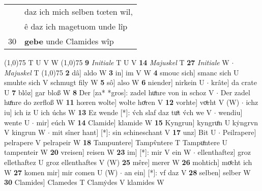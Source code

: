 \documentclass[8pt,a4paper,notitlepage]{article}
\begin{document}
\begin{table}[ht]
\begin{minipage}[t]{0.5\linewidth}
\begin{tabular}{rl}
 & daz ich mich selben tœten wil,\\ 
 & ê daz ich magetuom unde lîp\\ 
30 & \textbf{gebe} unde Clamides wîp\\ 
\end{tabular}
\scriptsize
\line(1,0){75} \newline
T U V W \newline
\line(1,0){75} \newline
\textbf{9} \textit{Initiale} T U V  \textbf{14} \textit{Majuskel} T  \textbf{27} \textit{Initiale} W   $\cdot$ \textit{Majuskel} T  \newline
\line(1,0){75} \newline
\textbf{2} dâ] aldo W \textbf{3} in] im V W \textbf{4} smouc sich] smanc sich U smuhte sich V schmugt fily W \textbf{5} sô] also W \textbf{6} niender] nirkein U  $\cdot$ krâte] da crate U \textbf{7} blôz] gar bloß W \textbf{8} Der [za* *gros]: zadel huͤnre von in schoz V  $\cdot$ Der zadel huͤnre do zerfloß W \textbf{11} hœren wolte] wolte hoͤren V \textbf{12} vorhte] voͤrht V (W)  $\cdot$ ichz iu] ich iz U ich úchs W \textbf{13} Ez wende [*]: v́ch slaf daz tuͦt v́ch we V  $\cdot$ wendiu] wente U  $\cdot$ mir] eúch W \textbf{14} Clamide] klamide W \textbf{15} Kyngrun] kyngruͦn U kẏngrvn V kingrun W  $\cdot$ mit sîner hant] [*]: sin schineschant V \textbf{17} unz] Bit U  $\cdot$ Peilrapere] pelrapere V pelrapeir W \textbf{18} Tampuntere] Tampv̂ntere T Tampuͦntere U tampenteir W \textbf{20} vreisen] reisen W \textbf{23} im] [*]: mir V ein W  $\cdot$ ellenthaftez] groz ellethaftez U groz ellenthaftes V (W) \textbf{25} mêre] merer W \textbf{26} mohtich] moͤcht ich W \textbf{27} komen mir] mir comen U (W)  $\cdot$ an ein] [*]: vf daz V \textbf{28} selben] selber W \textbf{30} Clamides] Clamedes T Clamẏdes V klamides W \newline
\end{minipage}
\end{table}
\end{document}
